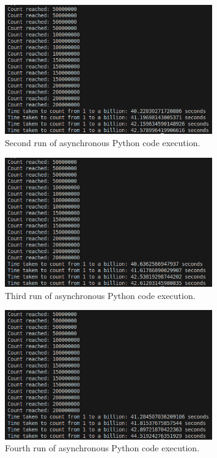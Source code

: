 \documentclass[12pt,a4paper]{article}
\begin{document}
\begin{figure}[htbp]
    \centering
    \includegraphics[width=0.8\textwidth]{../async_records/results_python/result_2.png}
    \caption{Second run of asynchronous Python code execution.}
    \label{fig:Python-async-runtime-2}
\end{figure}

\begin{figure}[htbp]
    \centering
    \includegraphics[width=0.8\textwidth]{../async_records/results_python/result_3.png}
    \caption{Third run of asynchronous Python code execution.}
    \label{fig:Python-async-runtime-3}
\end{figure}

\begin{figure}[htbp]
    \centering
    \includegraphics[width=0.8\textwidth]{../async_records/results_python/result_4.png}
    \caption{Fourth run of asynchronous Python code execution.}
    \label{fig:Python-async-runtime-4}
\end{figure}
\end{document}
